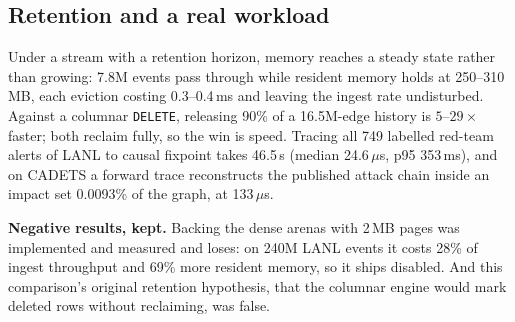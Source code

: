 \documentclass[letterpaper,twocolumn,10pt]{article}
\begin{document}
\subsection{Retention and a real workload}
Under a stream with a retention horizon, memory reaches a steady state
rather than growing: 7.8M events pass through while resident memory
holds at 250--310\,MB, each eviction costing 0.3--0.4\,ms and leaving
the ingest rate undisturbed. Against a columnar \texttt{DELETE},
releasing 90\% of a 16.5M-edge history is $5$--$29\times$ faster; both
reclaim fully, so the win is speed. Tracing all 749 labelled red-team alerts of LANL to
causal fixpoint takes 46.5\,s (median 24.6\,$\mu$s, p95 353\,ms), and on
CADETS a forward trace reconstructs the published attack chain inside
an impact set 0.0093\% of the graph, at 133\,$\mu$s.

\textbf{Negative results, kept.} Backing the dense arenas with 2\,MB
pages was implemented and measured
and loses: on 240M LANL events it costs 28\% of ingest throughput and
69\% more resident memory, so it ships disabled. And this comparison's
original retention hypothesis, that the columnar engine would mark
deleted rows without reclaiming, was false.

\end{document}
